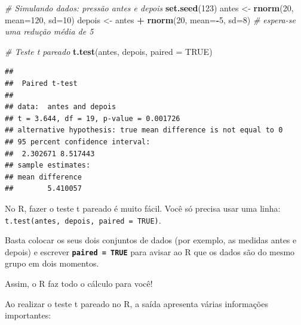 \documentclass[
]{book}
\newenvironment{Shaded}{\begin{snugshade}}{\end{snugshade}}
\newcommand{\AttributeTok}[1]{\textcolor[rgb]{0.13,0.29,0.53}{#1}}
\newcommand{\CommentTok}[1]{\textcolor[rgb]{0.56,0.35,0.01}{\textit{#1}}}
\newcommand{\ConstantTok}[1]{\textcolor[rgb]{0.56,0.35,0.01}{#1}}
\newcommand{\DecValTok}[1]{\textcolor[rgb]{0.00,0.00,0.81}{#1}}
\newcommand{\FunctionTok}[1]{\textcolor[rgb]{0.13,0.29,0.53}{\textbf{#1}}}
\newcommand{\NormalTok}[1]{#1}
\newcommand{\OtherTok}[1]{\textcolor[rgb]{0.56,0.35,0.01}{#1}}
\newcommand{\SpecialCharTok}[1]{\textcolor[rgb]{0.81,0.36,0.00}{\textbf{#1}}}
\begin{document}
\begin{Shaded}
\begin{Highlighting}[]
\CommentTok{\# Simulando dados: pressão antes e depois}
\FunctionTok{set.seed}\NormalTok{(}\DecValTok{123}\NormalTok{)}
\NormalTok{antes }\OtherTok{\textless{}{-}} \FunctionTok{rnorm}\NormalTok{(}\DecValTok{20}\NormalTok{, }\AttributeTok{mean=}\DecValTok{120}\NormalTok{, }\AttributeTok{sd=}\DecValTok{10}\NormalTok{)}
\NormalTok{depois }\OtherTok{\textless{}{-}}\NormalTok{ antes }\SpecialCharTok{+} \FunctionTok{rnorm}\NormalTok{(}\DecValTok{20}\NormalTok{, }\AttributeTok{mean=}\SpecialCharTok{{-}}\DecValTok{5}\NormalTok{, }\AttributeTok{sd=}\DecValTok{8}\NormalTok{) }\CommentTok{\# espera{-}se uma redução média de 5}

\CommentTok{\# Teste t pareado}
\FunctionTok{t.test}\NormalTok{(antes, depois, }\AttributeTok{paired =} \ConstantTok{TRUE}\NormalTok{)}
\end{Highlighting}
\end{Shaded}

\begin{verbatim}
## 
##  Paired t-test
## 
## data:  antes and depois
## t = 3.644, df = 19, p-value = 0.001726
## alternative hypothesis: true mean difference is not equal to 0
## 95 percent confidence interval:
##  2.302671 8.517443
## sample estimates:
## mean difference 
##        5.410057
\end{verbatim}

No R, fazer o teste t pareado é muito fácil. Você só precisa usar uma linha: \texttt{t.test(antes,\ depois,\ paired\ =\ TRUE)}.

Basta colocar os seus dois conjuntos de dados (por exemplo, as medidas antes e depois) e escrever \textbf{\texttt{paired\ =\ TRUE}} para avisar ao R que os dados são do mesmo grupo em dois momentos.

Assim, o R faz todo o cálculo para você!

Ao realizar o teste t pareado no R, a saída apresenta várias informações importantes:
\end{document}
